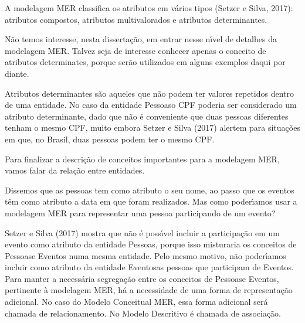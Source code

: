 \documentclass[
12pt,		%
openright,	%
twoside,  %
a4paper,			%
chapter=TITLE,		%
english,			%
french,				%
spanish,			%
brazil				%
]{USPSC-classe/USPSC_RedarTex}
\begin{document}
A modelagem MER classifica os atributos em v\'arios tipos (Setzer e Silva, 2017): atributos compostos, atributos multivalorados e atributos determinantes.










N\~ao temos interesse, nesta disserta\c{c}\~ao, em entrar nesse n\'{\i}vel de detalhes da modelagem MER. Talvez seja de interesse conhecer apenas o conceito de \textquotedbl atributos determinates\textquotedbl , porque ser\~ao utilizados em alguns exemplos daqui por diante.










Atributos determinantes s\~ao aqueles que n\~ao podem ter valores repetidos dentro de uma entidade. No caso da entidade \textquotedbl Pessoas\textquotedbl  o CPF poderia ser considerado um atributo determinante, dado que n\~ao \'e conveniente que duas pessoas diferentes tenham o mesmo CPF, muito embora  Setzer e Silva (2017) alertem para situa\c{c}\~oes em que, no Brasil, duas pessoas podem ter o mesmo CPF.










Para finalizar a descri\c{c}\~ao de conceitos importantes para a modelagem MER, vamos falar da rela\c{c}\~ao entre entidades.










Dissemos que as pessoas tem como atributo o seu nome, ao passo que os eventos t\^em como atributo a data em que foram realizados. Mas como poder\'{\i}amos usar a modelagem MER para representar uma pessoa participando de um evento?










Setzer e Silva (2017) mostra que n\~ao \'e poss\'{\i}vel incluir a participa\c{c}\~ao em um evento como atributo da entidade \textquotedbl Pessoas\textquotedbl , porque isso misturaria os conceitos de \textquotedbl Pessoas\textquotedbl  e Eventos numa mesma entidade. Pelo mesmo motivo, n\~ao poder\'{\i}amos incluir como atributo da entidade \textquotedbl Eventos\textquotedbl  as  pessoas que participam de \textquotedbl Eventos\textquotedbl . Para manter a necess\'aria segrega\c{c}\~ao entre os conceitos de \textquotedbl Pessoas\textquotedbl  e Eventos, pertinente \`a modelagem MER, h\'a a necessidade de uma forma de representa\c{c}\~ao adicional. No caso do Modelo Conceitual MER, essa forma adicional ser\'a chamada de \textquotedbl relacionamento\textquotedbl . No Modelo Descritivo \'e chamada de \textquotedbl associa\c{c}\~ao\textquotedbl .
\end{document}
